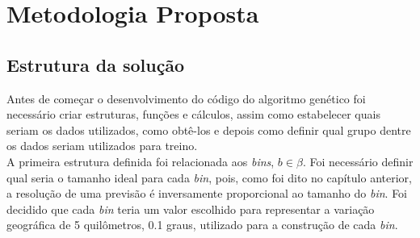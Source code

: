 \chapter{Metodologia Proposta}
\section{Estrutura da solução}
Antes de começar o desenvolvimento do código do algoritmo genético foi necessário criar estruturas, funções e cálculos, assim como estabelecer quais seriam os dados utilizados, como obtê-los e depois como definir qual grupo dentre os dados seriam utilizados para treino.\\

A primeira estrutura definida foi relacionada aos {\it bins}, $b \in \beta$. Foi necessário definir qual seria o tamanho ideal para cada {\it bin}, pois, como foi dito no capítulo anterior, a resolução de uma previsão é inversamente proporcional ao tamanho do {\it bin}. Foi decidido que cada {\it bin} teria um valor escolhido para representar a variação geográfica de 5 quilômetros, 0.1 graus, utilizado para a construção de cada {\it bin}.\\


